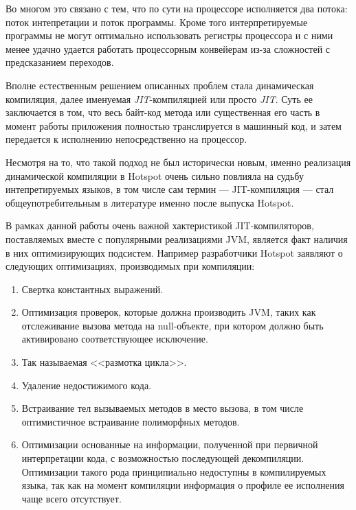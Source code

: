 Во многом это связано с тем, что по сути на процессоре исполняется два потока: поток интепретации
и поток программы.
Кроме того интерпретируемые программы не могут оптимально использовать регистры процессора и с ними
менее удачно удается работать процессорным конвейерам из-за сложностей с предсказанием
переходов\cite{JVMBranch}.


Вполне естественным решением описанных проблем стала динамическая компиляция, далее именуемая
\textit{JIT}-компиляцией или просто \textit{JIT}. Суть ее заключается в том, что весь байт-код
метода или существенная его часть в момент работы приложения полностью транслируется в машинный код,
и затем передается к исполнению непосредственно на процессор.

Несмотря на то, что такой подход не был исторически новым, именно реализация динамической
компиляции в Hotspot очень сильно повлияла на судьбу интепретируемых языков, в том числе
сам термин --- JIT-компиляция --- стал общеупотребительным в литературе именно после выпуска
Hotspot\cite{JITHistory}.

В рамках данной работы очень важной хактеристикой JIT-компиляторов, поставляемых вместе
с популярными реализациями JVM, является факт наличия в них оптимизирующих подсистем. Например
разработчики Hotspot заявляют о следующих оптимизациях, производимых при
компиляции\cite{HotSpotOT}:

\begin{enumerate}
    \item Свертка константных выражений.
    \item Оптимизация проверок, которые должна производить JVM, таких как отслеживание вызова
    метода на null-объекте, при котором должно быть активировано соответствующее исключение.
    \item Так называемая <<размотка цикла>>.
    \item Удаление недостижимого кода.
    \item Встраивание тел вызываемых методов в место вызова, в том числе оптимистичное встраивание
    полиморфных методов.
    \item Оптимизации основанные на информации, полученной при первичной интерпретации кода,
    с возможностью последующей декомпиляции. Оптимизации такого рода принципиально недоступны
    в компилируемых языка, так как на момент компиляции информация о профиле ее исполнения чаще
    всего отсутствует.
\end{enumerate}

